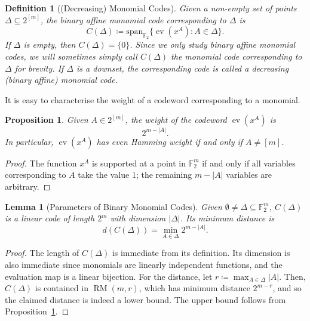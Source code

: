 \documentclass{article}
\newcounter{main}[section]
\newtheorem{definition}[main]{Definition}
\newtheorem{proposition}[main]{Proposition}
\newtheorem{lemma}[main]{Lemma}
\DeclareMathOperator{\ev}{ev}
\DeclareMathOperator{\RM}{RM}
\begin{document}
\begin{definition}[(Decreasing) Monomial Codes]\label{def:decreasing_monomial_code}
    Given a non-empty set of points $\Delta \subseteq 2^{[m]}$, the binary affine monomial code corresponding to $\Delta$ is
    \begin{equation}
        C(\Delta) \coloneq \text{span}_{\mathbb{F}_2}\{\ev(x^A):A \in \Delta\}.
    \end{equation}
    If $\Delta$ is empty, then $C(\Delta) = \{0\}$. Since we only study binary affine monomial codes, we will sometimes simply call $C(\Delta)$ the monomial code corresponding to $\Delta$ for brevity. If $\Delta$ is a downset, the corresponding code is called a decreasing (binary affine) monomial code.
\end{definition}
It is easy to characterise the weight of a codeword corresponding to a monomial.
\begin{proposition}\label{prop:monomial_codeword_weight}
    Given $A \in 2^{[m]}$, the weight of the codeword $\ev(x^A)$ is
    \begin{equation}
        2^{m-|A|}.
    \end{equation}
    In particular, $\ev(x^A)$ has even Hamming weight if and only if $A \neq [m]$.
\end{proposition}
\begin{proof}
    The function $x^A$ is supported at a point in $\mathbb{F}_2^m$ if and only if all variables corresponding to $A$ take the value $1$; the remaining $m-|A|$ variables are arbitrary.
\end{proof}
\begin{lemma}[Parameters of Binary Monomial Codes]
    Given $\emptyset \neq \Delta \subseteq \mathbb{F}_2^m$, $C(\Delta)$ is a linear code of length $2^m$ with dimension $|\Delta|$. Its minimum distance is
    \begin{equation}
        d(C(\Delta)) = \min_{A \in \Delta} 2^{m-|A|}.
    \end{equation}
\end{lemma}
\begin{proof}
    The length of $C(\Delta)$ is immediate from its definition. Its dimension is also immediate since monomials are linearly independent functions, and the evaluation map is a linear bijection. For the distance, let $r \coloneq \max_{A \in \Delta}|A|$. Then, $C(\Delta)$ is contained in $\RM(m,r)$, which has minimum distance $2^{m-r}$, and so the claimed distance is indeed a lower bound. The upper bound follows from Proposition~\ref{prop:monomial_codeword_weight}.
\end{proof}
\end{document}
